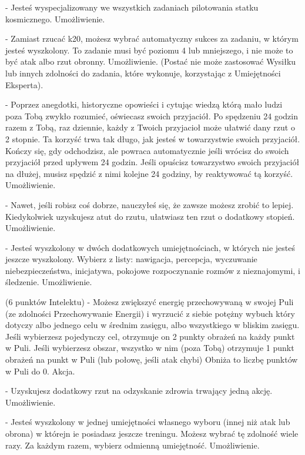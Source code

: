 { - Jesteś wyspecjalizowany we wszystkich zadaniach pilotowania statku kosmicznego. Umożliwienie.

 - Zamiast rzucać k20, możesz wybrać automatyczny sukces za zadaniu, w którym jesteś wyszkolony. To zadanie musi być poziomu 4 lub mniejszego, i nie może to być atak albo rzut obronny. Umożliwienie. (Postać nie może zastosować Wysiłku lub innych zdolności do zadania, które wykonuje, korzystając z Umiejętności Eksperta).

 - Poprzez anegdotki, historyczne opowieści i cytując wiedzą którą mało ludzi poza Tobą zwykło rozumieć, oświecasz swoich przyjaciół. Po spędzeniu 24 godzin razem z Tobą, raz dziennie, każdy z Twoich przyjacioł może ułatwić dany rzut o 2 stopnie. Ta korzyść trwa tak długo, jak jesteś w towarzystwie swoich przyjaciół. Kończy się, gdy odchodzisz, ale powraca automatycznie jeśli wrócisz do swoich przyjaciół przed upływem 24 godzin. Jeśli opuścisz towarzystwo swoich przyjaciół na dłużej, musisz spędzić z nimi kolejne 24 godziny, by reaktywować tą korzyść.  Umożliwienie.

 - Nawet, jeśli robisz coś dobrze, nauczyłeś się, że zawsze możesz zrobić to lepiej. Kiedykolwiek uzyskujesz atut do rzutu, ułatwiasz ten rzut o dodatkowy stopień. Umożliwienie. 

 - Jesteś wyszkolony w dwóch dodatkowych umiejętnościach, w których nie jesteś jeszcze wyszkolony. Wybierz z listy: nawigacja, percepcja, wyczuwanie niebezpieczeństwa, inicjatywa, pokojowe rozpoczynanie rozmów z nieznajomymi, i śledzenie. Umożliwienie. 

 (6 punktów Intelektu) - Możesz zwiększyć energię przechowywaną w swojej Puli (ze zdolności Przechowywanie Energii) i wyrzucić z siebie potężny wybuch który dotyczy albo jednego celu w średnim zasięgu, albo wszystkiego w bliskim zasięgu. Jeśli wybierzesz pojedynczy cel, otrzymuje on 2 punkty obrażeń na każdy punkt w Puli. Jeśli wybierzesz obszar, wszystko w nim (poza Tobą) otrzymuje 1 punkt obrażeń na punkt w Puli (lub połowę, jeśli atak chybi) Obniża to liczbę punktów w Puli do 0. Akcja. 

 - Uzyskujesz dodatkowy rzut na odzyskanie zdrowia trwający jedną akcję. Umożliwienie.

 - Jesteś wyszkolony w jednej umiejętności własnego wyboru (innej niż atak lub obrona) w którejn ie posiadasz jeszcze treningu. Możesz wybrać tę zdolność wiele razy. Za każdym razem, wybierz odmienną umiejętność. Umożliwienie.

}
